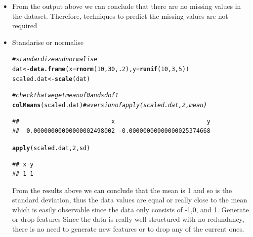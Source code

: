 \documentclass{article}\usepackage[]{graphicx}\usepackage[]{color}
\makeatletter
\newcommand{\hlnum}[1]{\textcolor[rgb]{0.686,0.059,0.569}{#1}}%
\newcommand{\hlcom}[1]{\textcolor[rgb]{0.678,0.584,0.686}{\textit{#1}}}%
\newcommand{\hlstd}[1]{\textcolor[rgb]{0.345,0.345,0.345}{#1}}%
\newcommand{\hlkwb}[1]{\textcolor[rgb]{0.69,0.353,0.396}{#1}}%
\newcommand{\hlkwc}[1]{\textcolor[rgb]{0.333,0.667,0.333}{#1}}%
\newcommand{\hlkwd}[1]{\textcolor[rgb]{0.737,0.353,0.396}{\textbf{#1}}}%
\newenvironment{kframe}{%
 \def\at@end@of@kframe{}%
 \ifinner\ifhmode%
  \def\at@end@of@kframe{\end{minipage}}%
  \begin{minipage}{\columnwidth}%
 \fi\fi%
 \def\FrameCommand##1{\hskip\@totalleftmargin \hskip-\fboxsep
 \colorbox{shadecolor}{##1}\hskip-\fboxsep
     \hskip-\linewidth \hskip-\@totalleftmargin \hskip\columnwidth}%
 \MakeFramed {\advance\hsize-\width
   \@totalleftmargin\z@ \linewidth\hsize
   \@setminipage}}%
 {\par\unskip\endMakeFramed%
 \at@end@of@kframe}
\newenvironment{knitrout}{}{} %
\makeatother
\begin{document}
\begin{itemize}
\item
\newline From the output above we can conclude that there are no missing values in the dataset. Therefore, techniques to predict the missing values are not required
\item
\newline Standarise or normalise 
\newline

\begin{knitrout}
\color{fgcolor}\begin{kframe}
\begin{alltt}
\hlcom{#standardize and normalise}
\hlstd{dat} \hlkwb{<-} \hlkwd{data.frame}\hlstd{(}\hlkwc{x} \hlstd{=} \hlkwd{rnorm}\hlstd{(}\hlnum{10}\hlstd{,} \hlnum{30}\hlstd{,} \hlnum{.2}\hlstd{),} \hlkwc{y} \hlstd{=} \hlkwd{runif}\hlstd{(}\hlnum{10}\hlstd{,} \hlnum{3}\hlstd{,} \hlnum{5}\hlstd{))}
\hlstd{scaled.dat} \hlkwb{<-} \hlkwd{scale}\hlstd{(dat)}

\hlcom{# check that we get mean of 0 and sd of 1}
\hlkwd{colMeans}\hlstd{(scaled.dat)}  \hlcom{# a version of apply(scaled.dat, 2, mean)}
\end{alltt}
\begin{verbatim}
##                          x                          y 
##  0.00000000000000002498002 -0.00000000000000025374668
\end{verbatim}
\begin{alltt}
\hlkwd{apply}\hlstd{(scaled.dat,} \hlnum{2}\hlstd{, sd)}
\end{alltt}
\begin{verbatim}
## x y 
## 1 1
\end{verbatim}
\end{kframe}
\end{knitrout}

\newline From the results above we can conclude that the mean is 1 and so is the standard deviation, thus the data values are equal or really close to the mean which is easily observable since the data
only consists of -1,0, and 1.
\newline
\newline
\newline
\newline
\newline Generate or drop features
\newline
\newline Since the data is really well structured with no redundancy, there is no need to generate new features or to drop any of the current ones.

\end{itemize}
\end{document}

